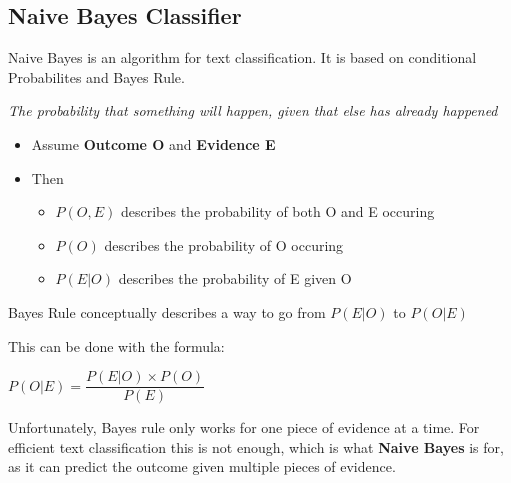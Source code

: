 \documentclass[
../../NLP4W_Summary.tex,
]
{subfiles}
\begin{document}
\subsection{Naive Bayes Classifier}
Naive Bayes is an algorithm for text classification. It is based on conditional Probabilites and Bayes Rule. 

\begin{greenbox}
    \textit{The probability that something will happen, given that else has already happened}
    \begin{itemize}
        \item Assume \textbf{Outcome O} and \textbf{Evidence E}
        \item Then 
        \begin{itemize}
            \item $P(O,E)$ describes the probability of both O and E occuring\\
            \rightarrow {}
            \item $P(O)$ describes the probability of O occuring\\ 
            \rightarrow {}
            \item $P(E|O)$ describes the probability of E given O\\
            \rightarrow {}
        \end{itemize}
    \end{itemize}
\end{greenbox}

\begin{greenbox}
    Bayes Rule conceptually describes a way to go from $P(E|O)$ to $P(O|E)$

    This can be done with the formula:\\
    \begin{center}
        \begin{smallmagbox*}
            $P(O|E) = \dfrac{P(E|O) \times P(O)}{P(E)}$
        \end{smallmagbox*}
    \end{center}
\end{greenbox}

Unfortunately, Bayes rule only works for one piece of evidence at a time. For efficient text classification this is not enough, which is what \textbf{Naive Bayes} is for, as it can predict the outcome given multiple pieces of evidence.
\end{document}
